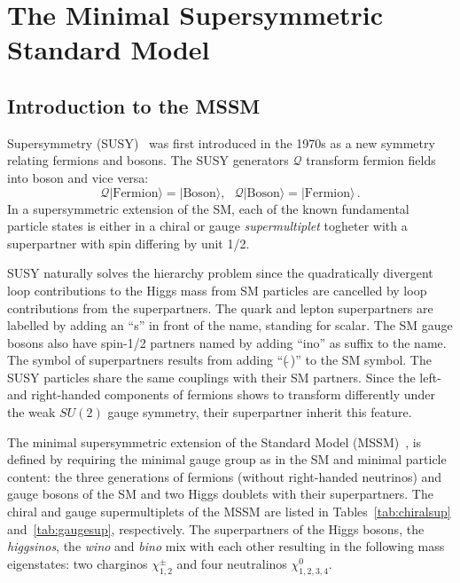  
\section{The Minimal Supersymmetric Standard Model}\label{sec:MSSM}
\subsection{Introduction to the MSSM}
Supersymmetry (SUSY)~\cite{Susy1,Susy2,Susy3} was first introduced in the 1970s as a new symmetry relating fermions and bosons.
The SUSY generators $\mathcal{Q}$ transform fermion fields into boson and vice versa:
\begin{equation}
\mathcal{Q}|\text{Fermion}\rangle = |\text{Boson}\rangle, ~ ~ ~ \mathcal{Q}|\text{Boson}\rangle = |\text{Fermion}\rangle\,.
\end{equation}
In a supersymmetric extension of the SM,  each of the known fundamental particle states 
is  either in  a chiral or gauge \emph{supermultiplet} togheter with a superpartner with spin differing by unit 1/2.

SUSY naturally solves the hierarchy problem since the quadratically divergent loop contributions to the Higgs mass from  SM 
particles are cancelled  by  loop contributions from the superpartners. 
The quark and lepton  superpartners are labelled by adding an ``s'' in front of the name, standing for scalar. 
The SM gauge bosons also have spin-1/2 partners named by adding ``ino'' as suffix to the name. 
The symbol of superpartners results from adding ``($\tilde{ ~ }$)'' to the SM symbol.
The SUSY particles share the same couplings with their SM partners. 
Since the left- and right-handed components of fermions shows to transform differently under the weak $SU(2)$ gauge symmetry,
their superpartner inherit this feature.

The  minimal supersymmetric extension of the Standard Model  (MSSM)~\cite{MSSM1,MSSM2,MSSM3,MSSM4,MSSM5,MSSM6}, 
is defined by requiring the minimal gauge group as in the SM and 
minimal particle content: the three generations of fermions (without right-handed neutrinos) and gauge bosons of the SM  and two Higgs doublets 
with their superpartners. The  chiral and gauge supermultiplets of the MSSM 
are listed in Tables~\ref{tab:chiralsup} and~\ref{tab:gaugesup}, respectively.
The superpartners of the Higgs bosons, the \emph{higgsinos},  the \emph{wino} and \emph{bino} 
mix with each other resulting in the following mass eigenstates: two charginos $\chi_{1,2}^\pm$ and four neutralinos $\chi_{1,2,3,4}^0$.

